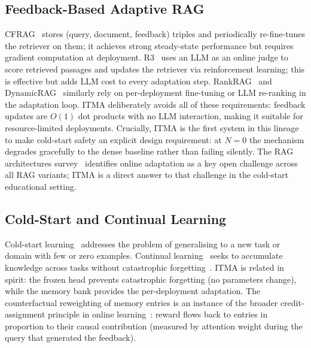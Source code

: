 \documentclass[journal]{IEEEtran}
\begin{document}
\subsection{Feedback-Based Adaptive RAG}
CFRAG~\cite{cfrag2025} stores (query, document, feedback) triples and
periodically re-fine-tunes the retriever on them; it achieves strong
steady-state performance but requires gradient computation at deployment.
R3~\cite{r32025} uses an LLM as an online judge to score retrieved passages
and updates the retriever via reinforcement learning; this is effective but
adds LLM cost to every adaptation step.  RankRAG~\cite{rankrag2024} and
DynamicRAG~\cite{dynamicrag2024} similarly rely on per-deployment
fine-tuning or LLM re-ranking in the adaptation loop.  ITMA deliberately
avoids all of these requirements: feedback updates are $O(1)$ dot products
with no LLM interaction, making it suitable for resource-limited deployments.
Crucially, ITMA is the first system in this lineage to make cold-start
safety an explicit design requirement: at $N{=}0$ the mechanism degrades
gracefully to the dense baseline rather than failing silently.  The RAG
architectures survey~\cite{gao2024ragsurv} identifies online adaptation as
a key open challenge across all RAG variants; ITMA is a direct answer to
that challenge in the cold-start educational setting.

\subsection{Cold-Start and Continual Learning}
Cold-start learning~\cite{pan2010transferlearning} addresses the problem of
generalising to a new task or domain with few or zero examples.  Continual
learning~\cite{kirkpatrick2017ewc} seeks to accumulate knowledge across
tasks without catastrophic forgetting~\cite{mccloskey1989catastrophic}.
ITMA is related in spirit: the frozen head prevents catastrophic forgetting
(no parameters change), while the memory bank provides the per-deployment
adaptation.  The counterfactual reweighting of memory entries is an
instance of the broader credit-assignment principle in online
learning~\cite{suttonbarto2018rl}: reward flows back to entries in
proportion to their causal contribution (measured by attention weight
during the query that generated the feedback).
\end{document}
